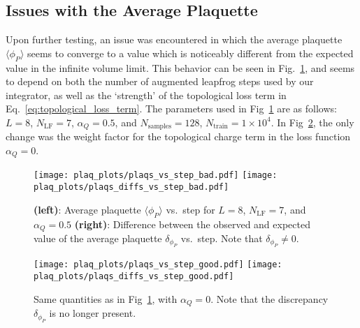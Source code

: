 \documentclass[main.tex]{subfiles}
\begin{document}
\subsection{Issues with the Average Plaquette}
%
Upon further testing, an issue was encountered in which the average plaquette $\langle \phi_{P}\rangle$ seems to
converge to a value which is noticeably different from the expected value in the infinite volume limit.
%
This behavior can be seen in Fig.~\ref{fig:bad_convergence}, and seems to depend on both the number of augmented
leapfrog steps used by our integrator, as well as the `strength' of the topological loss term in
Eq.~\ref{eq:topological_loss_term}.
%
The parameters used in Fig~\ref{fig:bad_convergence} are as follows: $L = 8$, $N_{\mathrm{LF}} = 7$, $\alpha_{Q} =
0.5$, and $N_{\mathrm{samples}} = 128$, $N_{\mathrm{train}} = 1\times10^{4}$.
%
In Fig~\ref{fig:good_convergence}, the only change was the weight factor for the topological charge term in the loss
function $\alpha_{Q} = 0$.
%
\begin{figure}[htpb]%
\label{fig:bad_convergence}
  \centering
    \texttt{[image: plaq\_plots/plaqs\_vs\_step\_bad.pdf]}
    \texttt{[image: plaq\_plots/plaqs\_diffs\_vs\_step\_bad.pdf]}
    \caption{\textbf{(left)}: Average plaquette $\langle\phi_{P}\rangle$ vs.\ step
      for $L=8$, $N_{\mathrm{LF}} = 7$, and $\alpha_{Q} = 0.5$ \textbf{(right)}: Difference between the observed and
      expected value of the average plaquette $\delta_{\phi_{P}}$ vs.\ step. Note that $\delta_{\phi_{P}} \neq 0$.}
\end{figure}
\begin{figure}[htpb]%
\label{fig:good_convergence}
  \vspace{-20pt}
  \centering
    \texttt{[image: plaq\_plots/plaqs\_vs\_step\_good.pdf]}
    \texttt{[image: plaq\_plots/plaqs\_diffs\_vs\_step\_good.pdf]}
    \caption{Same quantities as in Fig~\ref{fig:bad_convergence}, with $\alpha_{Q} = 0$. Note that the discrepancy
      $\delta_{\phi_{P}}$ is no longer present.}
\end{figure}
\end{document}
